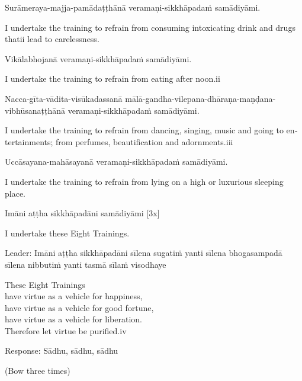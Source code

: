 Surāmeraya-majja-pamādaṭṭhānā veramaṇi-sikkhāpadaṁ samādiyāmi.\\

\begin{english}
I undertake the training to refrain from consuming intoxicating drink and drugs thatii lead to carelessness.\\
\end{english}

Vikālabhojanā veramaṇi-sikkhāpadaṁ samādiyāmi.\\

\begin{english}
I undertake the training to refrain from eating after noon.ii\\
\end{english}

Nacca-gīta-vādita-visūkadassanā mālā-gandha-vilepana-dhāraṇa-maṇḍana-vibhūsanaṭṭhānā veramaṇi-sikkhāpadaṁ samādiyāmi.\\

\begin{english}
I undertake the training to refrain from dancing, singing, music and going to entertainments; from perfumes, beautification and adornments.iii\\
\end{english}

Uccāsayana-mahāsayanā veramaṇi-sikkhāpadaṁ samādiyāmi.\\

\begin{english}
I undertake the training to refrain from lying on a high or luxurious sleeping place.\\
\end{english}

Imāni aṭṭha sikkhāpadāni samādiyāmi \hfill{[3x]}\\

\begin{english}
I undertake these Eight Trainings.\\
\end{english}

Leader: Imāni aṭṭha sikkhāpadāni sīlena sugatiṁ yanti sīlena bhogasampadā sīlena nibbutiṁ yanti tasmā sīlaṁ visodhaye\\

\begin{english}
These Eight Trainings\\
have virtue as a vehicle for happiness,\\
have virtue as a vehicle for good fortune,\\
have virtue as a vehicle for liberation.\\
Therefore let virtue be purified.iv\\
\end{english}

Response: Sādhu, sādhu, sādhu\\

\begin{center}
(Bow three times)\\
\end{center}
